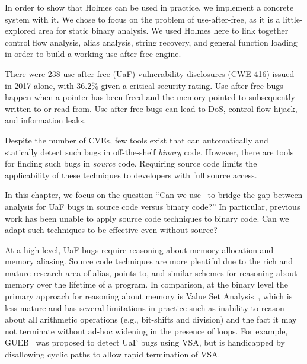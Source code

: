 In order to show that Holmes can be used in practice, we implement a concrete system with it.
We chose to focus on the problem of use-after-free, as it is a little-explored area for static binary analysis.
We used Holmes here to link together control flow analysis, alias analysis, string recovery, and general function loading in order to build a working use-after-free engine.

There were 238 use-after-free (UaF) vulnerability disclosures (CWE-416) issued in 2017 alone, with 36.2\% given a critical security
rating.
Use-after-free bugs happen when a pointer has been freed and the memory pointed to subsequently written to or read from.
Use-after-free bugs can lead to DoS, control flow hijack, and information leaks.

Despite the number of CVEs, few tools exist that can automatically and statically detect such bugs in off-the-shelf \emph{binary} code.
However, there are tools for finding such bugs in \emph{source} code.
Requiring source code limits the applicability of these techniques to developers with full source access.

In this chapter, we focus on the question
``Can we use \sysname\ to bridge the gap between analysis for UaF bugs in source code versus binary code?''
In particular, previous work has been unable to apply source code techniques to binary code.
Can we adapt such techniques to be effective even without source?

At a high level, UaF bugs require reasoning about memory allocation and memory aliasing.
Source code techniques are more plentiful due to the rich and mature research area of alias, points-to, and similar schemes for reasoning about memory over the lifetime of a program.
In comparison, at the binary level the primary approach for reasoning about memory is Value Set Analysis~\cite{vsa}, which is less mature and has several limitations in practice such as inability to reason about all arithmetic operations (e.g., bit-shifts and division) and the fact it may not terminate without ad-hoc widening in the presence of loops.
For example, GUEB~\cite{gueb} was proposed to detect UaF bugs using VSA, but is handicapped by disallowing cyclic paths to allow rapid termination of VSA.

